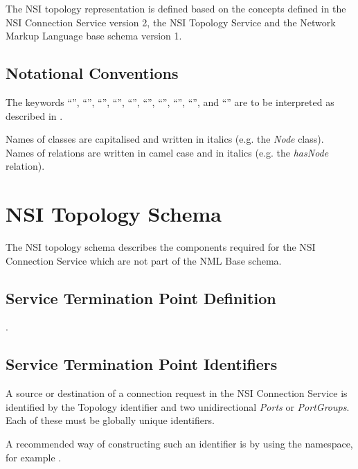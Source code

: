 \documentclass[12pt]{article}  %
\begin{document}
The NSI topology representation is defined based on the concepts defined in the NSI Connection Service version 2\cite{nsiv2}, the NSI Topology Service\cite{nsi-ts} and the Network Markup Language base schema version 1\cite{nml}.

\subsection{Notational Conventions}%
\label{sec:rfc2119}

The keywords “\MUST{}”, “\MUSTNOT{}”, “\REQUIRED{}”, “\SHALL{}”, “\SHALLNOT{}”, 
“\SHOULD{}”, “\SHOULDNOT{}”, “\RECOMMENDED{}”, “\MAY{}”,  and “\OPTIONAL{}” are 
to be interpreted as described in \cite{rfc2119}.

Names of classes are capitalised and written in italics (e.g. the \emph{Node} class).
Names of relations are written in camel case and in italics (e.g. the \emph{hasNode} relation).




\section{NSI Topology Schema}\label{sec:syntax}

The NSI topology schema describes the components required for the NSI Connection Service which are not part of the NML Base schema. 

\subsection{Service Termination Point Definition} %
\label{sub:service_termination_point_definition}

\todo{}.

\subsection{Service Termination Point Identifiers}

A source or destination of a connection request in the NSI Connection Service is identified by 
the Topology identifier and two unidirectional \emph{Ports} or \emph{PortGroups}. Each of these 
must be globally unique identifiers.

A recommended way of constructing such an identifier is by using 
the  namespace, for example .
\end{document}
